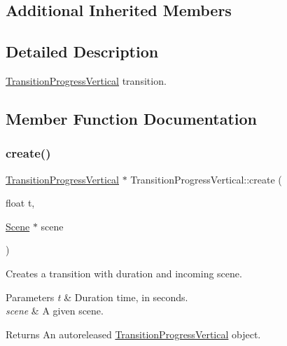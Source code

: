 \subsection*{Additional Inherited Members}


\subsection{Detailed Description}
\hyperlink{classTransitionProgressVertical}{Transition\+Progress\+Vertical} transition. 

\subsection{Member Function Documentation}
\mbox{\label{classTransitionProgressVertical_a7ca7bd89258253b9f27b3eca1c183bf1}} 
\subsubsection{\texorpdfstring{create()}{create()}\hspace{0.1cm}{\footnotesize\ttfamily [1/2]}}
{\footnotesize\ttfamily \hyperlink{classTransitionProgressVertical}{Transition\+Progress\+Vertical} $\ast$ Transition\+Progress\+Vertical\+::create (\begin{DoxyParamCaption}\item[{float}]{t,  }\item[{\hyperlink{classScene}{Scene} $\ast$}]{scene }\end{DoxyParamCaption})\hspace{0.3cm}{\ttfamily [static]}}

Creates a transition with duration and incoming scene.


\begin{DoxyParams}{Parameters}
{\em t} & Duration time, in seconds. \\
\hline
{\em scene} & A given scene. \\
\hline
\end{DoxyParams}
\begin{DoxyReturn}{Returns}
An autoreleased \hyperlink{classTransitionProgressVertical}{Transition\+Progress\+Vertical} object. 
\end{DoxyReturn}
\mbox{\label{classTransitionProgressVertical_aab123b8cfa38500defb47a29a255cd68}} 
